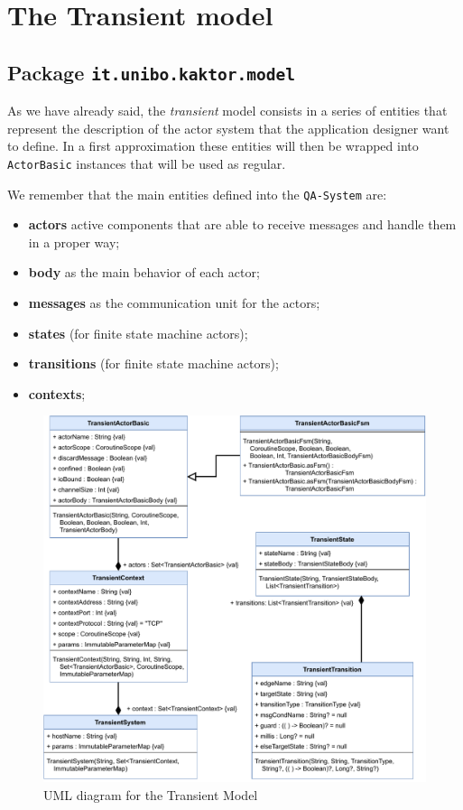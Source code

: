 \section{The Transient model}
\subsection{Package \texttt{it.unibo.kaktor.model}}

As we have already said, the \textit{transient} model consists in a series of entities that represent the description of the actor system that the application designer want to define.
In a first approximation these entities will then be wrapped into \texttt{ActorBasic} instances that will be used as regular.

We remember that the main entities defined into the \texttt{QA-System} are:
\begin{itemize}
	\item \textbf{actors} active components that are able to receive messages and handle them in a proper way;
	\item \textbf{body} as the main behavior of each actor;
	\item \textbf{messages} as the communication unit for the actors;
	\item \textbf{states} (for finite state machine actors);
	\item \textbf{transitions} (for finite state machine actors);
	\item \textbf{contexts};
\end{itemize}

\begin{figure}[h!]
	\centering
	\includegraphics[width=\textwidth]{img/[UML]it.unibo.kaktor.model}
	\caption{UML diagram for the Transient Model}
	\label{fig::uml_model}
\end{figure}


